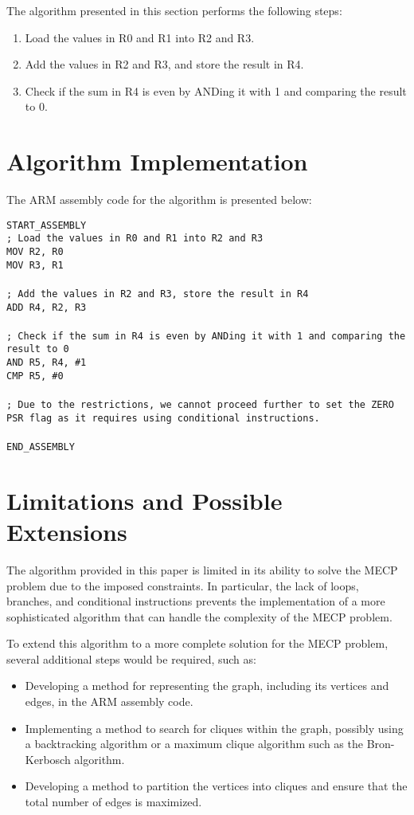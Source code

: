 The algorithm presented in this section performs the following steps:
\begin{enumerate}
    \item Load the values in R0 and R1 into R2 and R3.
    \item Add the values in R2 and R3, and store the result in R4.
    \item Check if the sum in R4 is even by ANDing it with 1 and comparing the result to 0.
\end{enumerate}

\section{Algorithm Implementation}

The ARM assembly code for the algorithm is presented below:

\noindent\texttt{START\_ASSEMBLY\\
; Load the values in R0 and R1 into R2 and R3\\
MOV R2, R0\\
MOV R3, R1\\
\\
; Add the values in R2 and R3, store the result in R4\\
ADD R4, R2, R3\\
\\
; Check if the sum in R4 is even by ANDing it with 1 and comparing the result to 0\\
AND R5, R4, \#1\\
CMP R5, \#0\\
\\
; Due to the restrictions, we cannot proceed further to set the ZERO PSR flag as it requires using conditional instructions.\\
\\
END\_ASSEMBLY}

\section{Limitations and Possible Extensions}

The algorithm provided in this paper is limited in its ability to solve the MECP problem due to the imposed constraints. In particular, the lack of loops, branches, and conditional instructions prevents the implementation of a more sophisticated algorithm that can handle the complexity of the MECP problem.

To extend this algorithm to a more complete solution for the MECP problem, several additional steps would be required, such as:
\begin{itemize}
    \item Developing a method for representing the graph, including its vertices and edges, in the ARM assembly code.
    \item Implementing a method to search for cliques within the graph, possibly using a backtracking algorithm or a maximum clique algorithm such as the Bron-Kerbosch algorithm.
    \item Developing a method to partition the vertices into cliques and ensure that the total number of edges is maximized.
\end{itemize}

